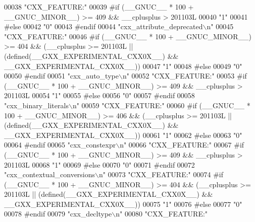 \begin{DoxyCode}
00038 \textcolor{stringliteral}{"CXX\_FEATURE:"}
00039 \textcolor{preprocessor}{#if (\_\_GNUC\_\_ * 100 + \_\_GNUC\_MINOR\_\_) >= 409 && \_\_cplusplus > 201103L}
00040 \textcolor{stringliteral}{"1"}
00041 \textcolor{preprocessor}{#else}
00042 \textcolor{stringliteral}{"0"}
00043 \textcolor{preprocessor}{#endif}
00044 \textcolor{stringliteral}{"cxx\_attribute\_deprecated\(\backslash\)n"}
00045 \textcolor{stringliteral}{"CXX\_FEATURE:"}
00046 \textcolor{preprocessor}{#if (\_\_GNUC\_\_ * 100 + \_\_GNUC\_MINOR\_\_) >= 404 && (\_\_cplusplus >= 201103L ||
       (defined(\_\_GXX\_EXPERIMENTAL\_CXX0X\_\_) && \_\_GXX\_EXPERIMENTAL\_CXX0X\_\_))}
00047 \textcolor{stringliteral}{"1"}
00048 \textcolor{preprocessor}{#else}
00049 \textcolor{stringliteral}{"0"}
00050 \textcolor{preprocessor}{#endif}
00051 \textcolor{stringliteral}{"cxx\_auto\_type\(\backslash\)n"}
00052 \textcolor{stringliteral}{"CXX\_FEATURE:"}
00053 \textcolor{preprocessor}{#if (\_\_GNUC\_\_ * 100 + \_\_GNUC\_MINOR\_\_) >= 409 && \_\_cplusplus > 201103L}
00054 \textcolor{stringliteral}{"1"}
00055 \textcolor{preprocessor}{#else}
00056 \textcolor{stringliteral}{"0"}
00057 \textcolor{preprocessor}{#endif}
00058 \textcolor{stringliteral}{"cxx\_binary\_literals\(\backslash\)n"}
00059 \textcolor{stringliteral}{"CXX\_FEATURE:"}
00060 \textcolor{preprocessor}{#if (\_\_GNUC\_\_ * 100 + \_\_GNUC\_MINOR\_\_) >= 406 && (\_\_cplusplus >= 201103L ||
       (defined(\_\_GXX\_EXPERIMENTAL\_CXX0X\_\_) && \_\_GXX\_EXPERIMENTAL\_CXX0X\_\_))}
00061 \textcolor{stringliteral}{"1"}
00062 \textcolor{preprocessor}{#else}
00063 \textcolor{stringliteral}{"0"}
00064 \textcolor{preprocessor}{#endif}
00065 \textcolor{stringliteral}{"cxx\_constexpr\(\backslash\)n"}
00066 \textcolor{stringliteral}{"CXX\_FEATURE:"}
00067 \textcolor{preprocessor}{#if (\_\_GNUC\_\_ * 100 + \_\_GNUC\_MINOR\_\_) >= 409 && \_\_cplusplus > 201103L}
00068 \textcolor{stringliteral}{"1"}
00069 \textcolor{preprocessor}{#else}
00070 \textcolor{stringliteral}{"0"}
00071 \textcolor{preprocessor}{#endif}
00072 \textcolor{stringliteral}{"cxx\_contextual\_conversions\(\backslash\)n"}
00073 \textcolor{stringliteral}{"CXX\_FEATURE:"}
00074 \textcolor{preprocessor}{#if (\_\_GNUC\_\_ * 100 + \_\_GNUC\_MINOR\_\_) >= 404 && (\_\_cplusplus >= 201103L ||
       (defined(\_\_GXX\_EXPERIMENTAL\_CXX0X\_\_) && \_\_GXX\_EXPERIMENTAL\_CXX0X\_\_))}
00075 \textcolor{stringliteral}{"1"}
00076 \textcolor{preprocessor}{#else}
00077 \textcolor{stringliteral}{"0"}
00078 \textcolor{preprocessor}{#endif}
00079 \textcolor{stringliteral}{"cxx\_decltype\(\backslash\)n"}
00080 \textcolor{stringliteral}{"CXX\_FEATURE:"}

\end{DoxyCode}
